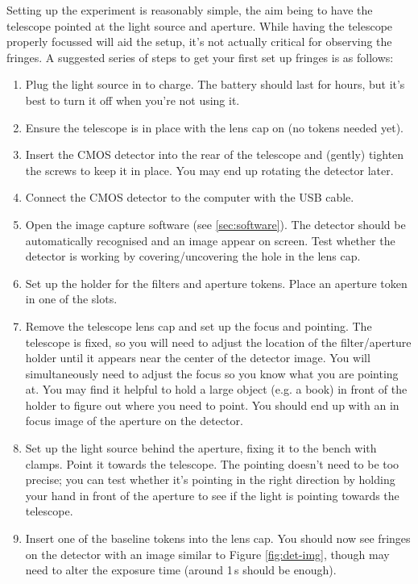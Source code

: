 \documentclass[11pt]{article}
\begin{document}
Setting up the experiment is reasonably simple, the aim being to have the telescope pointed at the light source and aperture. While having the telescope properly focussed will aid the setup, it's not actually critical for observing the fringes. A suggested series of steps to get your first set up fringes is as follows:

\begin{enumerate}
    \item Plug the light source in to charge. The battery should last for hours, but it's best to turn it off when you're not using it.
    \item Ensure the telescope is in place with the lens cap on (no tokens needed yet).
    \item Insert the CMOS detector into the rear of the telescope and (gently) tighten the screws to keep it in place. You may end up rotating the detector later.
    \item Connect the CMOS detector to the computer with the USB cable.
    \item Open the image capture software (see \ref{sec:software}). The detector should be automatically recognised and an image appear on screen. Test whether the detector is working by covering/uncovering the hole in the lens cap.
    \item Set up the holder for the filters and aperture tokens. Place an aperture token in one of the slots.
    \item Remove the telescope lens cap and set up the focus and pointing. The telescope is fixed, so you will need to adjust the location of the filter/aperture holder until it appears near the center of the detector image. You will simultaneously need to adjust the focus so you know what you are pointing at. You may find it helpful to hold a large object (e.g. a book) in front of the holder to figure out where you need to point. You should end up with an in focus image of the aperture on the detector.
    \item Set up the light source behind the aperture, fixing it to the bench with clamps. Point it towards the telescope. The pointing doesn't need to be too precise; you can test whether it's pointing in the right direction by holding your hand in front of the aperture to see if the light is pointing towards the telescope.
    \item Insert one of the baseline tokens into the lens cap. You should now see fringes on the detector with an image similar to Figure \ref{fig:det-img}, though may need to alter the exposure time (around 1\,s should be enough).
\end{enumerate}
\end{document}
